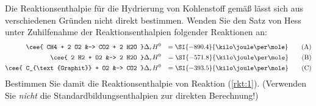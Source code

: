 \documentclass[ahaeffekt]{exercise}
\begin{document}
Die Reaktionsenthalpie für die Hydrierung von Kohlenstoff gemäß
%
lässt sich aus verschiedenen Gründen nicht direkt bestimmen. Wenden Sie den Satz von Hess unter Zuhilfenahme der Reaktionsenthalpien folgender Reaktionen an:
\begin{align}
 \cee{ CH4 + 2 O2 &-> CO2 + 2 H2O }      & \Delta_rH^0 &= \SI{-890.4}{\kilo\joule\per\mole} \tag{A}\label{rkt:A} \\
 \cee{ 2 H2 + O2 &-> 2 H2O }             & \Delta_rH^0 &= \SI{-571.8}{\kilo\joule\per\mole} \tag{B}\label{rkt:B} \\
 \cee{ C_{\text{Graphit}} + O2 &-> CO2 } & \Delta_rH^0 &= \SI{-393.5}{\kilo\joule\per\mole} \tag{C}\label{rkt:C}
\end{align}
Bestimmen Sie damit die Reaktionsenthalpie von Reaktion (\ref{rkt:1}). (Verwenden Sie \emph{nicht} die Standardbildungsenthalpien zur direkten Berechnung!)
\end{document}
